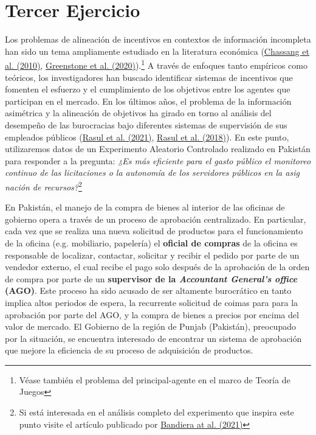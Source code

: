\documentclass[a4paper, answers, addpoints, 11pt]{exam}
\begin{document}
\section*{Tercer Ejercicio}
Los problemas de alineación de incentivos en contextos de información incompleta han sido un tema ampliamente estudiado en la literatura económica (\href{https://www.nber.org/papers/w16343}{Chassang et al. (2010)}, \href{https://www.nber.org/papers/w27502}{Greenstone et al. (2020)}).\footnote{\footnotesize{Véase también el problema del principal-agente en el marco de Teoría de Juegos}} A través de enfoques tanto empíricos como teóricos, los investigadores han buscado identificar sistemas de incentivos que fomenten el esfuerzo y el cumplimiento de los objetivos entre los agentes que participan en el mercado. En los últimos años, el problema de la información asimétrica y la alineación de objetivos ha girado en torno al análisis del desempeño de las burocracias bajo diferentes sistemas de supervisión de sus empleados públicos (\href{https://academic.oup.com/jpart/article/31/2/259/5974047}{Rasul et al. (2021)}, \href{https://academic.oup.com/ej/article-abstract/128/608/413/5068981?redirectedFrom=fulltext}{Rasul et al. (2018)}). En este punto, utilizaremos datos de un Experimento Aleatorio Controlado realizado en Pakistán para responder a la pregunta: \textit{¿Es más eficiente para el gasto público el monitoreo continuo de las licitaciones o la autonomía de los servidores públicos en la asig
nación de recursos?}\footnote{\footnotesize{Si está interesada en el análisis completo del experimento que inspira este punto visite el artículo publicado por \href{https://academic.oup.com/qje/article-abstract/136/4/2195/6354797?redirectedFrom=fulltext}{Bandiera at al. (2021)}}}

\bigbreak
En Pakistán, el manejo de la compra de bienes al interior de las oficinas de gobierno opera a través de un proceso de aprobación centralizado. En particular, cada vez que se realiza una nueva solicitud de productos para el funcionamiento de la oficina (e.g. mobiliario, papelería) el \textbf{oficial de compras} de la oficina es responsable de localizar, contactar, solicitar y recibir el pedido por parte de un vendedor externo, el cual recibe el pago solo después de la aprobación de la orden de compra por parte de un \textbf{supervisor de la \textit{Accountant General’s office} (AGO)}. Este proceso ha sido acusado de ser altamente burocrático en tanto implica altos periodos de espera, la recurrente solicitud de coimas para para la aprobación por parte del AGO, y la compra de bienes a precios por encima del valor de mercado. El Gobierno de la región de Punjab (Pakistán), preocupado por la situación, se encuentra interesado de encontrar un sistema de aprobación que mejore la eficiencia de su proceso de adquisición de productos.
\end{document}
